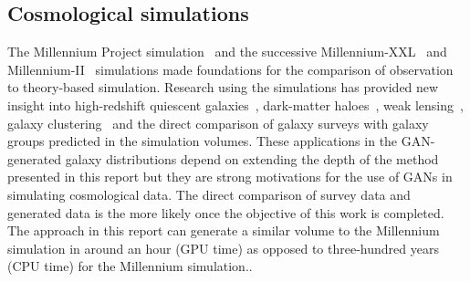 \documentclass[twocolumn]{article}
\numberwithin{equation}{section}
\begin{document}
\subsection{Cosmological simulations}
The Millennium Project simulation~\cite{millsim} and the successive Millennium-XXL~\cite{millxxlsim} and 
Millennium-II~\cite{mill2sim} simulations made foundations for the comparison of observation to theory-based simulation. 
Research using the simulations has provided new insight into high-redshift quiescent galaxies~\cite{mill_quiescent},
dark-matter haloes~\cite{mill_dm_haloes}, weak lensing~\cite{mill_weak_lensing}, galaxy clustering~\cite{mill_gal_clustering} 
and the direct comparison of galaxy surveys with galaxy groups predicted in the simulation volumes\cite{mill_sdss}. 
These applications in the GAN-generated galaxy distributions depend on extending the depth of the method presented in 
this report but they are strong motivations for the use of GANs in simulating cosmological data. The direct comparison 
of survey data and generated data is the more likely once the objective of this work is completed. The approach in this 
report can generate a similar volume to the Millennium simulation in around an hour (GPU time) as opposed to 
three-hundred years (CPU time) for the Millennium simulation.\footnotemark.


\end{document}
